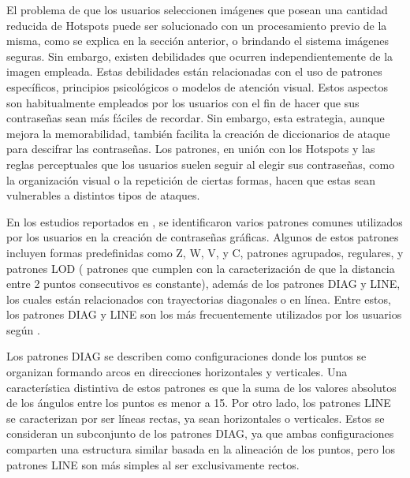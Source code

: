 \documentclass[12pt]{report}
\begin{document}
El problema de que los usuarios seleccionen imágenes que posean una cantidad reducida de Hotspots puede ser solucionado con un procesamiento previo de la misma, como se explica en la sección anterior, o brindando el sistema imágenes seguras. Sin embargo, existen debilidades que ocurren independientemente de la imagen empleada. Estas debilidades están relacionadas con el uso de patrones específicos, principios psicológicos o modelos de atención visual. Estos aspectos son habitualmente empleados por los usuarios con el fin de hacer que sus contraseñas sean más fáciles de recordar. Sin embargo, esta estrategia, aunque mejora la memorabilidad, también facilita la creación de diccionarios de ataque para descifrar las contraseñas. Los patrones, en unión con los Hotspots y las reglas perceptuales que los usuarios suelen seguir al elegir sus contraseñas, como la organización visual o la repetición de ciertas formas, hacen que estas sean vulnerables a distintos tipos de ataques.



En los estudios reportados en \cite{5,20,21,22,23,24,25}, se identificaron varios patrones comunes utilizados por los usuarios en la creación de contraseñas gráficas. Algunos de estos patrones incluyen formas predefinidas como Z, W, V, y C, patrones agrupados, regulares, y patrones LOD ( patrones que cumplen con la caracterización de que la distancia entre 2 puntos consecutivos es constante), además de los patrones DIAG y LINE, los cuales están relacionados con trayectorias diagonales o en línea. Entre estos, los patrones DIAG y LINE son los más frecuentemente utilizados por los usuarios según \cite{5}.

Los patrones DIAG se describen como configuraciones donde los puntos se organizan formando arcos en direcciones horizontales y verticales. Una característica distintiva de estos patrones es que la suma de los valores absolutos de los ángulos entre los puntos es menor a 15\degree. Por otro lado, los patrones LINE se caracterizan por ser líneas rectas, ya sean horizontales o verticales. Estos se consideran un subconjunto de los patrones DIAG, ya que ambas configuraciones comparten una estructura similar basada en la alineación de los puntos, pero los patrones LINE son más simples al ser exclusivamente rectos.
\end{document}
